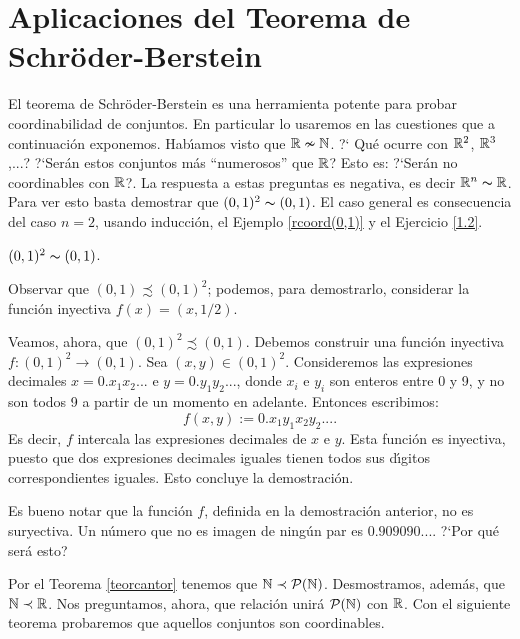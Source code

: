 \section{Aplicaciones del Teorema de Schr\"oder-Berstein}

El teorema de Schr\"oder-Berstein es una herramienta potente para
probar coordinabilidad de conjuntos. En particular lo usaremos en
las cuestiones que a continuaci\'on exponemos. Hab\'{\i}amos visto
que $\rr\nsim\nn$. ?` Qu\'e ocurre con $\rr^2$, $\rr^3$,...?
?`Ser\'an estos conjuntos m\'as ``numerosos'' que $\rr$? Esto es:
?`Ser\'an no coordinables con $\rr$?. La respuesta a estas
preguntas es negativa, es decir $\rr^n\thicksim\rr$. Para ver esto
basta demostrar que $(0,1)^2\thicksim (0,1)$. El caso general es
consecuencia del caso $n=2$, usando inducci\'on, el Ejemplo
\vref{rcoord(0,1)} y el Ejercicio \vref{1.2}.

\begin{teorema} $(0,1)^2\thicksim (0,1)$.
\end{teorema}
\begin{demo} Observar que $(0,1)\precsim (0,1)^2$; podemos, para
demostrarlo, considerar la funci\'on inyectiva $f(x)=(x,1/2)$.

Veamos, ahora, que $(0,1)^2\precsim (0,1)$. Debemos construir una
funci\'on inyectiva $f:(0,1)^2\longrightarrow (0,1)$. Sea
$(x,y)\in (0,1)^2$. Consideremos las expresiones decimales
$x=0.x_1x_2...$ e $y=0.y_1y_2...$, donde $x_i$ e $y_i$ son enteros
entre 0 y 9, y no son todos 9 a partir de un momento en adelante.
Entonces escribimos:
\[f(x,y):=0.x_1y_1x_2y_2....\]
Es decir, $f$ intercala las expresiones decimales de $x$ e $y$.
Esta funci\'on es inyectiva, puesto que dos expresiones decimales
iguales tienen todos sus d\'{\i}gitos correspondientes iguales.
Esto concluye la demostraci\'on.
\end{demo}

Es bueno notar que la funci\'on $f$, definida en la demostraci\'on
anterior, no es suryectiva. Un n\'umero que no es imagen de
ning\'un par es $0.909090...$. ?`Por qu\'e ser\'a esto?

Por el Teorema \vref{teorcantor} tenemos que
$\nn\prec\mathcal{P}(\nn)$. Desmostramos, adem\'as, que $\nn\prec
\rr$. Nos preguntamos, ahora, que relaci\'on unir\'a
$\mathcal{P}(\nn)$ con $\rr$. Con el siguiente teorema probaremos
que aquellos conjuntos son coordinables.

